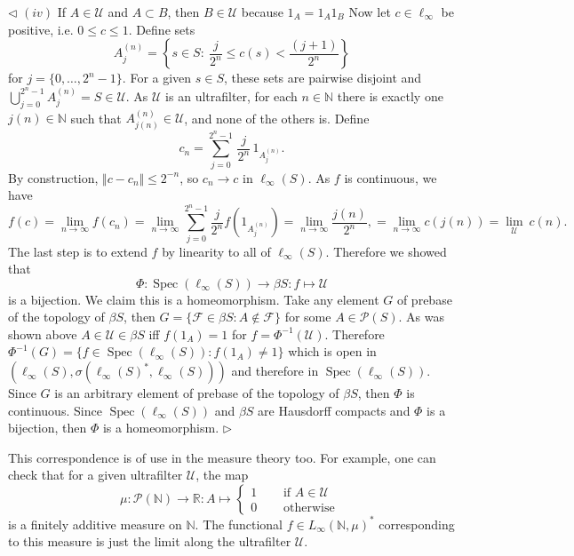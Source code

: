 \documentclass[12pt]{article}
\newenvironment{proof}{\par $\triangleleft$}{$\triangleright$}
\begin{document}
\begin{proof}
    $(iv)$ If $A\in\mathcal U$ and $A\subset B$, then $B\in\mathcal U$ because
    $1_A=1_A 1_B$
    \newline
    Now let $c\in\ell_\infty$ be positive, i.e. $0\leq c\leq 1$. Define sets
    $$
        A_j^{(n)}=\left \{s\in S:
        \ \frac{j}{2^n}\leq c(s)<\frac{(j+1)}{2^n}\right \}
    $$
    for $j=\{0,\ldots,2^n-1\}$. For a given $s\in S$, these sets are pairwise
    disjoint and $\bigcup_{j=0}^{2^n-1}A_j^{(n)}=S\in\mathcal{U}$. As
    $\mathcal{U}$ is an ultrafilter, for each $n\in\mathbb{N}$ there is exactly
    one $j(n)\in\mathbb{N}$ such that $A_{j(n)}^{(n)}\in\mathcal U$, and none of
    the others is. Define
    $$
        c_n=\sum_{j=0}^{2^n-1}\,\frac{j}{2^n}\,1_{A_j^{(n)}}.
    $$
    By construction, $\Vert c-c_n\Vert\leq 2^{-n}$, so $c_n\to c$ in
    $\ell_\infty(S)$. As $f$ is continuous, we have
    $$
        f(c)
        =\lim_{n\to\infty} f(c_n)
        =\lim_{n\to\infty}\sum_{j=0}^{2^n-1}\frac{j}{2^n}f(1_{A_j^{(n)}})
        =\lim_{n\to\infty}\frac{j(n)}{2^n},
        =\lim_{n\to\infty} c(j(n))
        =\lim_{\mathcal U}\ c(n).
    $$
    The last step is to extend $f$ by linearity to all of $\ell_\infty(S)$.
    Therefore we showed that
    $$
        \Phi:\operatorname{Spec}(\ell_\infty(S))\to \beta S:f\mapsto \mathcal{U}
    $$
    is a bijection. We claim this is a homeomorphism. Take any element $G$ of
    prebase of the topology of $\beta S$, then $G=\{\mathcal{F}\in\beta S:
        A\notin\mathcal{F}\}$ for some $A\in\mathcal{P}(S)$. As was shown above
    $A\in\mathcal{U}\in\beta S$ iff $f(1_A)=1$ for $f=\Phi^{-1}(\mathcal{U})$.
    Therefore $\Phi^{-1}(G)=\{f\in\operatorname{Spec}(\ell_\infty(S)):
        f(1_A)\neq 1\}$ which is open in
    $({\ell}_\infty(S),\sigma({\ell_\infty(S)}^*,\ell_\infty(S)))$ and therefore
    in $\operatorname{Spec}(\ell_\infty(S))$. Since $G$ is an arbitrary element
    of prebase of the topology of $\beta S$, then $\Phi$ is continuous. Since
    $\operatorname{Spec}(\ell_\infty(S))$ and $\beta S$ are Hausdorff compacts
    and $\Phi$ is a bijection, then $\Phi$ is a homeomorphism.
\end{proof}

This correspondence is of use in the measure theory too. For example, one can
check that for a given ultrafilter $\mathcal{U}$, the map
$$
    \mu:\mathcal{P}(\mathbb{N})\to\mathbb{R}:A\mapsto\begin{cases} 1
         & \quad\mbox{ if } A\in\mathcal{U} \\ 0&\quad\mbox{ otherwise }\end{cases}
$$
is a finitely additive measure on $\mathbb{N}$. The functional $f\in
    {L_\infty(\mathbb{N}, \mu)}^*$ corresponding to this measure is just the
limit along the ultrafilter $\mathcal{U}$.
\end{document}
